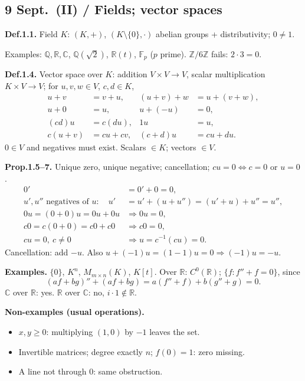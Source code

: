 \documentclass[11pt,letterpaper]{article}
\newcommand{\tightlist}{\setlength{\itemsep}{0pt}\setlength{\parskip}{0pt}}
\begin{document}
\subsection{9 Sept.~(II) / Fields; vector
spaces}\label{sept.-ii-fields-vector-spaces}

\textbf{Def.1.1.} Field \(K\): \((K,+)\), \((K\setminus\{0\},\cdot)\)
abelian groups + distributivity; \(0\ne1\).

Examples: \(\mathbb Q,\mathbb R,\mathbb C\), \(\mathbb Q(\sqrt2)\),
\(\mathbb R(t)\), \(\mathbb F_p\) (\(p\) prime).
\(\mathbb Z/6\mathbb Z\) fails: \(2\cdot3=0\).

\textbf{Def.1.4.} Vector space over \(K\): addition \(V\times V\to V\),
scalar multiplication \(K\times V\to V\); for \(u,v,w\in V\),
\(c,d\in K\), \[
\begin{aligned}
u+v&=v+u,&(u+v)+w&=u+(v+w),\\
u+0&=u,&u+(-u)&=0,\\
(cd)u&=c(du),&1u&=u,\\
c(u+v)&=cu+cv,&(c+d)u&=cu+du.
\end{aligned}
\] \(0\in V\) and negatives must exist. Scalars \(\in K\); vectors
\(\in V\).

\textbf{Prop.1.5--7.} Unique zero, unique negative; cancellation;
\(cu=0\iff c=0\) or \(u=0\). \[
\begin{aligned}
0'&=0'+0=0,\\
u',u''\text{ negatives of }u:\quad
u'&=u'+(u+u'')=(u'+u)+u''=u'',\\
0u=(0+0)u=0u+0u&\Rightarrow0u=0,\\
c0=c(0+0)=c0+c0&\Rightarrow c0=0,\\
cu=0,\ c\ne0&\Rightarrow u=c^{-1}(cu)=0.
\end{aligned}
\] Cancellation: add \(-u\). Also
\(u+(-1)u=(1-1)u=0\Rightarrow(-1)u=-u\).

\textbf{Examples.} \(\{0\}\), \(K^n\), \(M_{m\times n}(K)\), \(K[t]\).
Over \(\mathbb R\): \(C^0(\mathbb R)\); \(\{f:f''+f=0\}\), since \[
(af+bg)''+(af+bg)=a(f''+f)+b(g''+g)=0.
\] \(\mathbb C\) over \(\mathbb R\): yes. \(\mathbb R\) over
\(\mathbb C\): no, \(i\cdot1\notin\mathbb R\).

\textbf{Non-examples (usual operations).}

\begin{itemize}
\tightlist
\item
  \(x,y\ge0\): multiplying \((1,0)\) by \(-1\) leaves the set.
\item
  Invertible matrices; degree exactly \(n\); \(f(0)=1\): zero missing.
\item
  A line not through \(0\): same obstruction.
\end{itemize}
\end{document}
